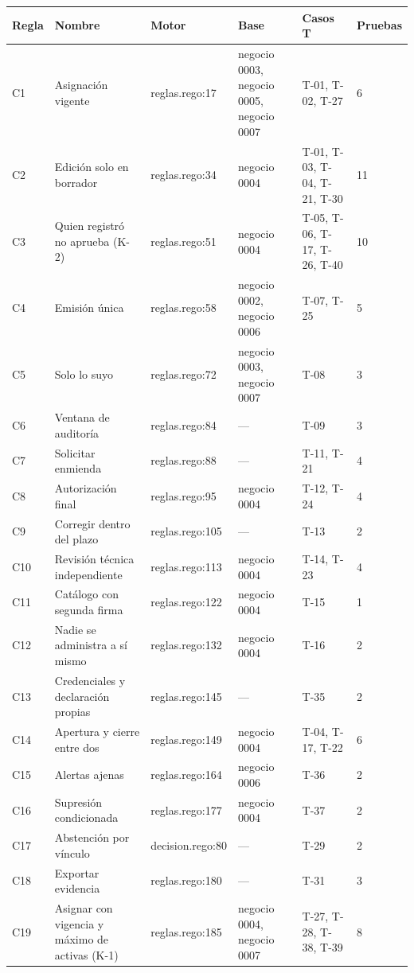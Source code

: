 \documentclass[11pt,letterpaper]{article}
\newcommand{\cab}[1]{\textbf{\rmfamily #1}}
\begin{document}
\begin{center}
\scriptsize
\renewcommand{\arraystretch}{1.0}
\begin{longtable}{@{}p{1.0cm} p{4.6cm} p{2.4cm} p{2.7cm} p{2.9cm} p{1.2cm}@{}}
\toprule
\cab{Regla} & \cab{Nombre} & \cab{Motor} & \cab{Base} & \cab{Casos T} & \cab{Pruebas} \\
\midrule
\endhead
C1 & Asignación vigente & reglas.rego:17 & negocio 0003, negocio 0005, negocio 0007 & T-01, T-02, T-27 & 6  \\
C2 & Edición solo en borrador & reglas.rego:34 & negocio 0004 & T-01, T-03, T-04, T-21, T-30 & 11  \\
C3 & Quien registró no aprueba (K-2) & reglas.rego:51 & negocio 0004 & T-05, T-06, T-17, T-26, T-40 & 10  \\
C4 & Emisión única & reglas.rego:58 & negocio 0002, negocio 0006 & T-07, T-25 & 5  \\
C5 & Solo lo suyo & reglas.rego:72 & negocio 0003, negocio 0007 & T-08 & 3  \\
C6 & Ventana de auditoría & reglas.rego:84 & — & T-09 & 3  \\
C7 & Solicitar enmienda & reglas.rego:88 & — & T-11, T-21 & 4  \\
C8 & Autorización final & reglas.rego:95 & negocio 0004 & T-12, T-24 & 4  \\
C9 & Corregir dentro del plazo & reglas.rego:105 & — & T-13 & 2  \\
C10 & Revisión técnica independiente & reglas.rego:113 & negocio 0004 & T-14, T-23 & 4  \\
C11 & Catálogo con segunda firma & reglas.rego:122 & negocio 0004 & T-15 & 1  \\
C12 & Nadie se administra a sí mismo & reglas.rego:132 & negocio 0004 & T-16 & 2  \\
C13 & Credenciales y declaración propias & reglas.rego:145 & — & T-35 & 2  \\
C14 & Apertura y cierre entre dos & reglas.rego:149 & negocio 0004 & T-04, T-17, T-22 & 6  \\
C15 & Alertas ajenas & reglas.rego:164 & negocio 0006 & T-36 & 2  \\
C16 & Supresión condicionada & reglas.rego:177 & negocio 0004 & T-37 & 2  \\
C17 & Abstención por vínculo & decision.rego:80 & — & T-29 & 2  \\
C18 & Exportar evidencia & reglas.rego:180 & — & T-31 & 3  \\
C19 & Asignar con vigencia y máximo de activas (K-1) & reglas.rego:185 & negocio 0004, negocio 0007 & T-27, T-28, T-38, T-39 & 8  \\

\end{longtable}
\end{center}
\end{document}
